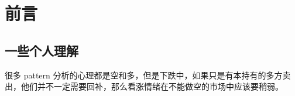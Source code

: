 \chapter*{前言}
\section*{一些个人理解}
很多 pattern 分析的心理都是空和多，但是下跌中，如果只是有本持有的多方卖出，他们并不一定需要回补，那么看涨情绪在不能做空的市场中应该要稍弱。